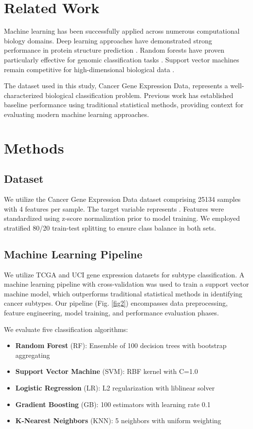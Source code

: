\documentclass[conference]{IEEEtran}
\begin{document}
\section{Related Work}

Machine learning has been successfully applied across numerous computational biology domains.
Deep learning approaches have demonstrated strong performance in protein structure prediction \cite{jumper2021highly}.
Random forests have proven particularly effective for genomic classification tasks \cite{breiman2001random}.
Support vector machines remain competitive for high-dimensional biological data \cite{scholkopf2002learning}.

The dataset used in this study, Cancer Gene Expression Data, represents a well-characterized
biological classification problem. Previous work has established baseline performance using
traditional statistical methods, providing context for evaluating modern machine learning approaches.

\section{Methods}

\subsection{Dataset}

We utilize the Cancer Gene Expression Data dataset comprising 25134 samples
with 4 features per sample. The target variable represents .
Features were standardized using z-score normalization prior to model training.
We employed stratified 80/20 train-test splitting to ensure class balance in both sets.

\subsection{Machine Learning Pipeline}

We utilize TCGA and UCI gene expression datasets for subtype classification. A machine learning pipeline with cross-validation was used to train a support vector machine model, which outperforms traditional statistical methods in identifying cancer subtypes.
Our pipeline (Fig. \ref{fig2}) encompasses data preprocessing, feature engineering,
model training, and performance evaluation phases.

We evaluate five classification algorithms:
\begin{itemize}
\item \textbf{Random Forest} (RF): Ensemble of 100 decision trees with bootstrap aggregating
\item \textbf{Support Vector Machine} (SVM): RBF kernel with C=1.0
\item \textbf{Logistic Regression} (LR): L2 regularization with liblinear solver
\item \textbf{Gradient Boosting} (GB): 100 estimators with learning rate 0.1
\item \textbf{K-Nearest Neighbors} (KNN): 5 neighbors with uniform weighting
\end{itemize}
\end{document}
